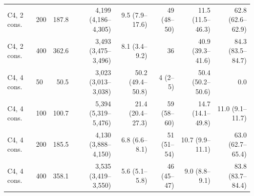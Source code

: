\begin{tabular}{llrrrrrr}
C4, 2 cons. & 200 & 187.8 & 4,199 (4,186--4,305) & 9.5 (7.9--17.6) & 49 (48--50) & 11.5 (11.5--46.3) & 62.8 (62.6--62.9) \\
C4, 2 cons. & 400 & 362.6 & 3,493 (3,475--3,496) & 8.1 (3.4--9.2) & 36 & 40.9 (39.3--41.6) & 84.3 (83.5--84.7) \\
\addlinespace[2pt]
C4, 4 cons. & 50 & 50.5 & 3,023 (3,013--3,038) & 50.2 (49.4--50.8) & 4 (2--5) & 50.4 (50.2--50.6) & 0.0 \\
C4, 4 cons. & 100 & 100.7 & 5,394 (5,319--5,476) & 21.4 (20.4--27.3) & 59 (58--60) & 14.7 (14.1--49.8) & 11.0 (9.1--11.7) \\
C4, 4 cons. & 200 & 185.5 & 4,130 (3,888--4,150) & 6.8 (6.6--8.1) & 51 (51--54) & 10.7 (9.9--11.1) & 63.0 (62.7--65.4) \\
C4, 4 cons. & 400 & 358.1 & 3,535 (3,419--3,550) & 5.6 (5.1--5.8) & 46 (45--47) & 9.0 (8.8--9.1) & 83.8 (83.7--84.4) \\
\bottomrule
\end{tabular}
